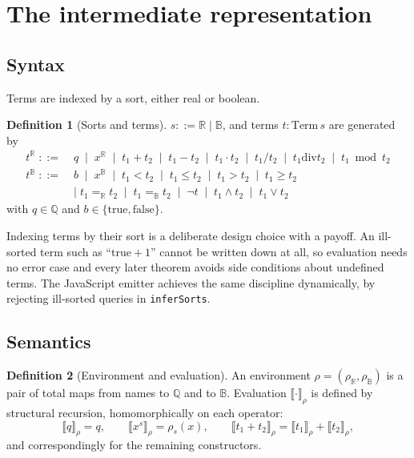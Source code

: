 \documentclass[11pt,a4paper]{article}
\newcommand{\seme}[2]{\llbracket #1 \rrbracket_{#2}}
\newcommand{\Bool}{\mathbb{B}}
\newcommand{\Real}{\mathbb{R}}
\newcommand{\Rat}{\mathbb{Q}}
\newcommand{\code}[1]{\texttt{#1}}
\theoremstyle{definition}
\newtheorem{definition}{Definition}[section]
\theoremstyle{plain}
\theoremstyle{remark}
\begin{document}
\section{The intermediate representation}

\subsection{Syntax}

Terms are indexed by a sort, either real or boolean.

\begin{definition}[Sorts and terms]
$s ::= \Real \mid \Bool$, and terms $t : \mathrm{Term}\,s$ are generated by
\[
\begin{aligned}
t^{\Real} \;::=\;& q \;\mid\; x^{\Real}
  \;\mid\; t_1 + t_2 \;\mid\; t_1 - t_2 \;\mid\; t_1 \cdot t_2
  \;\mid\; t_1 / t_2 \;\mid\; t_1 \mathbin{\mathrm{div}} t_2 \;\mid\; t_1 \bmod t_2 \\
t^{\Bool} \;::=\;& b \;\mid\; x^{\Bool}
  \;\mid\; t_1 < t_2 \;\mid\; t_1 \le t_2 \;\mid\; t_1 > t_2 \;\mid\; t_1 \ge t_2 \\
  &\mid\; t_1 =_{\Real} t_2 \;\mid\; t_1 =_{\Bool} t_2
  \;\mid\; \neg t \;\mid\; t_1 \wedge t_2 \;\mid\; t_1 \vee t_2
\end{aligned}
\]
with $q \in \Rat$ and $b \in \{\text{true},\text{false}\}$.
\end{definition}

Indexing terms by their sort is a deliberate design choice with a payoff. An
ill-sorted term such as ``$\text{true} + 1$'' cannot be written down at all, so
evaluation needs no error case and every later theorem avoids side conditions
about undefined terms. The JavaScript emitter achieves the same discipline
dynamically, by rejecting ill-sorted queries in \code{inferSorts}.

\subsection{Semantics}

\begin{definition}[Environment and evaluation]
An environment $\rho = (\rho_{\Real}, \rho_{\Bool})$ is a pair of total maps
from names to $\Rat$ and to $\Bool$. Evaluation $\seme{\cdot}{\rho}$ is defined
by structural recursion, homomorphically on each operator:
\[
  \seme{q}{\rho} = q, \qquad
  \seme{x^s}{\rho} = \rho_s(x), \qquad
  \seme{t_1 + t_2}{\rho} = \seme{t_1}{\rho} + \seme{t_2}{\rho},
\]
and correspondingly for the remaining constructors.
\end{definition}
\end{document}
